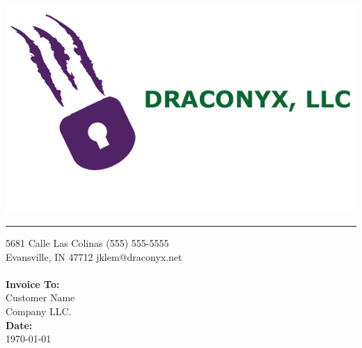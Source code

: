 \documentclass{invoice} %
\def \tab {\hspace*{3ex}} %
\begin{document}

\hfil{\includegraphics[scale=0.3]{draconyx-splash.jpg}}\hfil
\hrule %

5681 Calle Las Colinas \hfill (555) 555-5555 \\ %
Evansville, IN 47712  \hfill jklem@draconyx.net
\\ \\
{\bf Invoice To:} \\
\tab Customer Name\\ %
\tab Company LLC. \\ %
{\bf Date:} \\
\tab \today \\ %


\begin{invoiceTable}



\end{invoiceTable}

\end{document}
